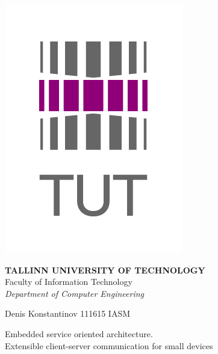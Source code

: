 \begin{titlepage}
	\begin{center}	
		\begin{minipage}[h]{0.01\linewidth}
			\begin{flushleft}	
				\includegraphics[scale=0.2]{../images/template/ttu_logo_2.jpg}
			\end{flushleft}		
		\end{minipage}
		\begin{minipage}[h]{0.98\linewidth}
			\begin{center}
				
				\textbf{TALLINN UNIVERSITY OF TECHNOLOGY}\\			
				Faculty of Information Technology \\			
				\textit{Department of Computer Engineering} \\			
		
			\end{center}
		\end{minipage}
	\end{center}
	\vspace{3cm}
	
	\begin{center}
		Denis Konstantinov \footnotesize \textsf{111615 IASM}
	\end{center}
	
	\vspace{5em}
	
	\begin{center} 
		\Large {Embedded service oriented architecture.}\\
		\vspace{1em}
		\small {Extensible client-server communication for small devices}\\	
	\end{center}
	

\end{titlepage}
